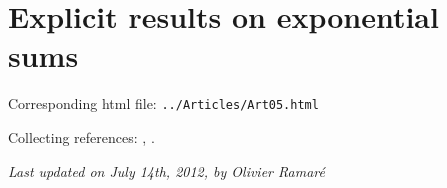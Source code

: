 \chapter{   Explicit results on exponential sums}

Corresponding html file: \texttt{../Articles/Art05.html}










Collecting references:
\cite{Granville-Ramare*96},
\cite{Daboussi-Rivat*01}.



 
 







  
\begin{flushright}\small\sl{}   Last updated on July 14th, 2012, by Olivier Ramar\'e
 \end{flushright}















